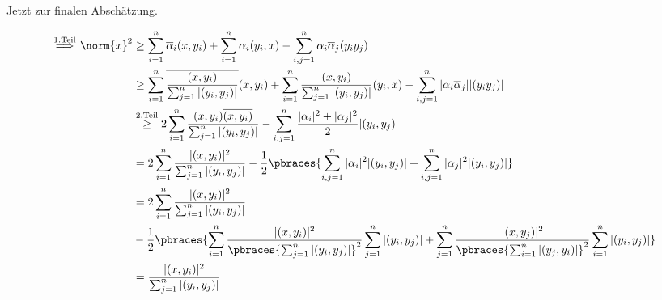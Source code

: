 \begin{solution}
Jetzt zur finalen Abschätzung.

\begin{align*}
    \stackrel
    {
        \mathrm{1. Teil}
    }{\implies}
    \norm{x}^2
    & \geq
    \sum_{i=1}^n \overline \alpha_i (x, y_i)
    +
    \sum_{i=1}^n \alpha_i (y_i, x)
    -
    \sum_{i,j=1}^n \alpha_i \overline \alpha_j (y_i y_j) \\
    & \geq
    \sum_{i=1}^n
    \overline
    {
        \frac
        {
            (x, y_i)
        }{
            \sum_{j=1}^n |(y_i, y_j)|
        }
    }
    (x, y_i)    
    +
    \sum_{i=1}^n
    \frac
    {
        (x, y_i)
    }{
        \sum_{j=1}^n |(y_i, y_j)|
    }
    (y_i, x)
    -
    \sum_{i,j=1}^n |\alpha_i \overline \alpha_j| |(y_i y_j)| \\
    & \stackrel
    {
        \mathrm{2. Teil}
    }{\geq}
    2 \sum_{i=1}^n
    \frac
    {
        (x, y_i)
        \overline{(x, y_i)}
    }{
        \sum_{j=1}^n |(y_i, y_j)|
    }
    -
    \sum_{i,j=1}^n
    \frac
    {
        |\alpha_i|^2 + |\alpha_j|^2
    }{2}
    |(y_i, y_j)| \\
    & =
    2 \sum_{i=1}^n
    \frac
    {
        |(x, y_i)|^2
    }{
        \sum_{j=1}^n |(y_i, y_j)|
    }
    -
    \frac{1}{2}
    \pbraces
    {
        \sum_{i,j=1}^n |\alpha_i|^2 |(y_i, y_j)|
        +
        \sum_{i,j=1}^n |\alpha_j|^2 |(y_i, y_j)|    
    } \\
    & =
    2 \sum_{i=1}^n
    \frac
    {
        |(x, y_i)|^2
    }{
        \sum_{j=1}^n |(y_i, y_j)|
    } \\
    & -
    \frac{1}{2}
    \pbraces
    {
        \sum_{i=1}^n
        \frac
        {
            |(x, y_i)|^2
        }{
            \pbraces
            {
                \sum_{j=1}^n |(y_i, y_j)|
            }^2
        }
        \sum_{j=1}^n |(y_i, y_j)|
        +
        \sum_{j=1}^n
        \frac
        {
            |(x, y_j)|^2
        }{
            \pbraces
            {
                \sum_{i=1}^n |(y_j, y_i)|
            }^2
        }
        \sum_{i=1}^n |(y_i, y_j)|
    } \\
    & =
    \frac
    {
        |(x, y_i)|^2
    }{
        \sum_{j=1}^n |(y_i, y_j)|
    }
\end{align*}

\end{solution}

